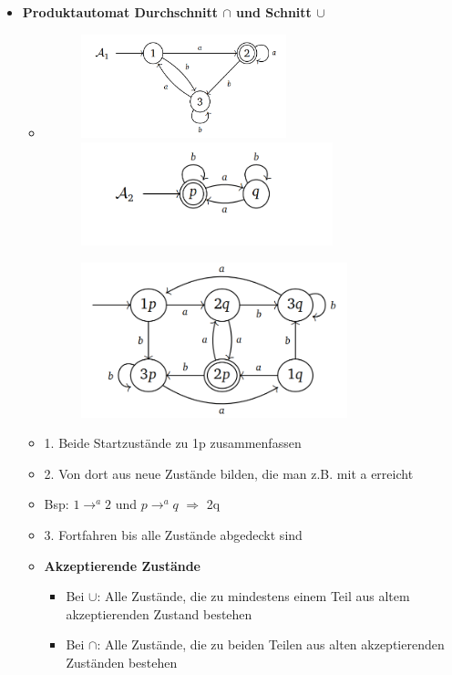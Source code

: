 \documentclass[11pt,a4paper]{article}
\begin{document}
\begin{itemize}

\item {\large \textbf{Produktautomat Durchschnitt $\cap$ und Schnitt $\cup$}}
	\begin{itemize}
	
	\item[]
		\begin{minipage}{0.4\textwidth}
				\begin{figure}[H]
				\includegraphics[height=3cm]{Bilder/durchschnitt1}
				\includegraphics[height=3cm]{Bilder/durchschnitt3}
				\end{figure}
			\end{minipage}
			\begin{minipage}[t]{0.4\textwidth}
				\vspace{-3cm}
				\begin{figure}[H]
				\includegraphics[height=4.5cm]{Bilder/durchschnitt2}
				\end{figure}
			\end{minipage}
	\item 1. Beide Startzustände zu 1p zusammenfassen
	\item 2. Von dort aus neue Zustände bilden, die man z.B. mit a erreicht
	\item Bsp: $1 \rightarrow^a 2$ und $p \rightarrow^a q$ $\Rightarrow$ 2q
	\item 3. Fortfahren bis alle Zustände abgedeckt sind
	\item \textbf{Akzeptierende Zustände}
		\begin{itemize}
		\item Bei $\cup$: Alle Zustände, die zu mindestens einem Teil aus altem akzeptierenden Zustand bestehen
		\item Bei $\cap$: Alle Zustände, die zu beiden Teilen aus alten akzeptierenden Zuständen bestehen
		\end{itemize}
	

\end{itemize}
\end{itemize}
\end{document}
